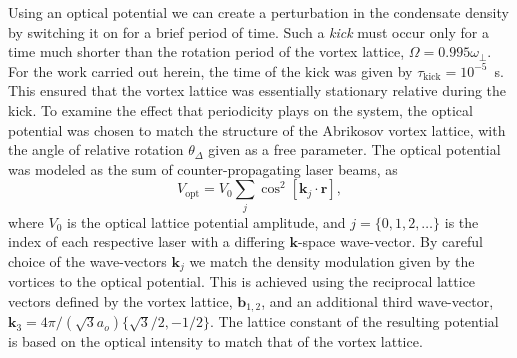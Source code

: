 Using an optical potential we can create a perturbation in the condensate density by switching it on for a brief period of time. Such a {\it kick} must occur only for a time much shorter than the rotation period of the vortex lattice, $\Omega = 0.995\omega_\perp$. For the work carried out herein, the time of the kick was given by $\tau_{\text{kick}}=10^{-5}$~s. This ensured that the vortex lattice was essentially stationary relative during the kick. To examine the effect that periodicity plays on the system, the optical potential was chosen to match the structure of the Abrikosov vortex lattice, with the angle of relative rotation $\theta_\Delta$ given as a free parameter. The optical potential was modeled as the sum of counter-propagating laser beams, as
\begin{equation}
    V_{\text{opt}} = V_0\displaystyle\sum_{j}\cos^2 \left[ \textbf{k}_{j}\cdot\textbf{r} \right],
\end{equation}
where $V_0$ is the optical lattice potential amplitude, and $j=\lbrace 0,1,2,\ldots \rbrace$ is the index of each respective laser with a differing $\mathbf{k}$-space wave-vector. By careful choice of the wave-vectors $\textbf{k}_{j}$ we match the density modulation given by the vortices to the optical potential. This is achieved using the reciprocal lattice vectors defined by the vortex lattice, $\mathbf{b}_{1,2}$, and an additional third wave-vector, $\mathbf{k}_3 = 4\pi/(\sqrt{3}a_o)\{\sqrt{3}/2,-1/2\}$. The lattice constant of the resulting potential is based on the optical intensity to match that of the vortex lattice.











